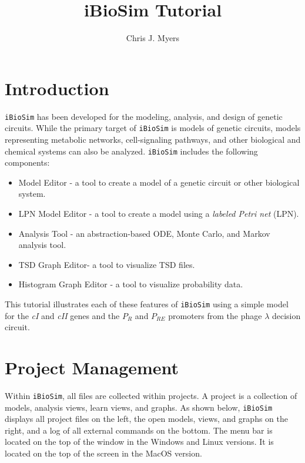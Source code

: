 \documentclass[titlepage,11pt]{article}
\title{iBioSim Tutorial}
\author{Chris J. Myers}
\begin{document}
\maketitle

  
\tableofcontents

\clearpage
  

\section{Introduction}

\noindent
{\tt iBioSim} has been developed for the modeling, analysis, and design of genetic circuits.  While the primary target of {\tt iBioSim} is models of genetic circuits, models representing metabolic networks, cell-signaling pathways, and other biological and chemical systems can also be analyzed.  {\tt iBioSim} includes the following components: 

\begin{itemize}
\item Model Editor - a tool to create a model of a genetic circuit or other biological system.
\item LPN Model Editor - a tool to create a model using a \emph{labeled Petri net} (LPN).
\item Analysis Tool - an abstraction-based ODE, Monte Carlo, and Markov analysis tool.
\item TSD Graph Editor- a tool to visualize TSD files. 
\item Histogram Graph Editor - a tool to visualize probability data. 
\end{itemize}

This tutorial illustrates each of these features of {\tt iBioSim} using a simple model for the \emph{cI} and \emph{cII} genes and the $P_R$ and $P_{RE}$ promoters from the phage $\lambda$ decision circuit.  


\section{Project Management}

\noindent
Within {\tt iBioSim}, all files are collected within projects.   A project is a collection of models, analysis views, learn views, and graphs.  As shown below, {\tt iBioSim} displays all project files on the left, the open models, views, and graphs on the right, and a log of all external commands on the bottom.  The menu bar is located on the top of the window in the Windows and Linux versions.  It is located on the top of the screen in the MacOS version.
\end{document}
